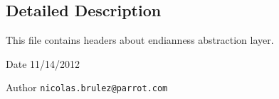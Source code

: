 \subsection{Detailed Description}
This file contains headers about endianness abstraction layer. \begin{DoxyDate}{Date}
11/14/2012 
\end{DoxyDate}
\begin{DoxyAuthor}{Author}
{\tt nicolas.brulez@parrot.com} 
\end{DoxyAuthor}
